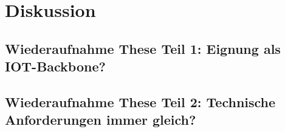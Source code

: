 \chapter{Diskussion}
\label{ch:discussion}


%
%
\section{Wiederaufnahme These Teil 1: Eignung als IOT-Backbone?}
\label{sec:discussion:part1}


%
%
\section{Wiederaufnahme These Teil 2: Technische Anforderungen immer gleich?}
\label{sec:discussion:part2}
